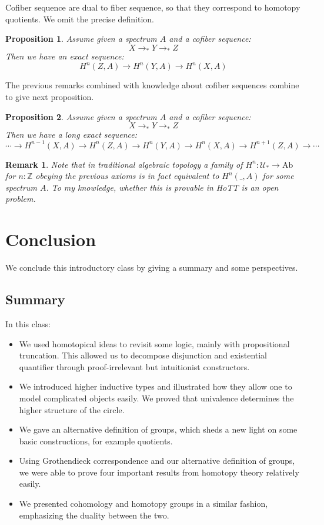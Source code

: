 \documentclass{article}
\newcommand{\se}[1]{\medbreak \medbreak \section{#1}}
\newcommand{\sse}[1]{\medbreak \subsection{#1}}
\newcommand{\U}{{\mathcal U}}
\renewcommand{\r}{\rightarrow}
\newtheorem{proposition}{Proposition}
\newtheorem{remark}{Remark}
\begin{document}
Cofiber sequence are dual to fiber sequence, so that they correspond to homotopy quotients. We omit the precise definition.

\begin{proposition}
Assume given a spectrum $A$ and a cofiber sequence: 
\[X\r_* Y\r_* Z\]
Then we have an exact sequence:
\[H^n(Z,A) \r H^n(Y,A) \r H^n(X,A) \]
\end{proposition}

The previous remarks combined with knowledge about cofiber sequences combine to give next proposition.

\begin{proposition}
Assume given a spectrum $A$ and a cofiber sequence: 
\[X\r_* Y\r_* Z\]
Then we have a long exact sequence:
\[\cdots \r H^{n-1}(X,A) \r H^n(Z,A) \r H^n(Y,A) \r H^n(X,A) \r H^{n+1}(Z,A) \r \cdots \]
\end{proposition}


\begin{remark}
Note that in traditional algebraic topology a family of $H^n : \U_* \r \mathrm{Ab}$ for $n:\mathbb{Z}$ obeying the previous axioms is in fact equivalent to $H^n(\_,A)$ for some spectrum $A$. To my knowledge, whether this is provable in HoTT is an open problem. %
\end{remark}



\se{Conclusion}

We conclude this introductory class by giving a summary and some perspectives. 

\sse{Summary}
In this class:
\begin{itemize}
\item We used homotopical ideas to revisit some logic, mainly with propositional truncation. This allowed us to decompose disjunction and existential quantifier through proof-irrelevant but intuitionist constructors. %
\item We introduced higher inductive types and illustrated how they allow one to model complicated objects easily. We proved that univalence determines the higher structure of the circle.
\item We gave an alternative definition of groups, which sheds a new light on some basic constructions, for example quotients.
\item Using Grothendieck correspondence and our alternative definition of groups, we were able to prove four important results from homotopy theory relatively easily. %
\item We presented cohomology and homotopy groups in a similar fashion, emphasizing the duality between the two.
\end{itemize}
\end{document}
